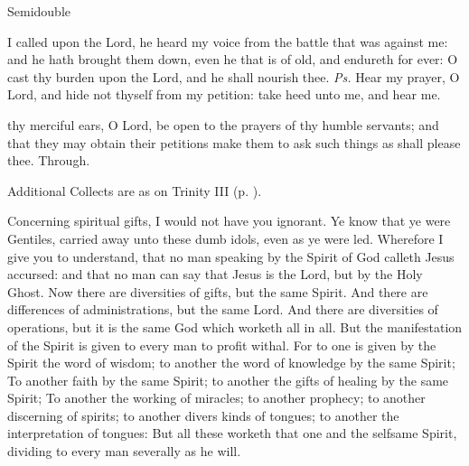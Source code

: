 \begin{inhead}
{Semidouble}
\end{inhead}
\par\noindent
{}



\introit
{} I called upon the Lord, he heard my voice from the battle that was against me: and he hath brought them down, even he that is of old, and endureth for ever: O cast thy burden upon the Lord, and he shall nourish thee. \textit{Ps.} Hear my prayer, O Lord, and hide not thyself from my petition: take heed unto me, and hear me.

\collect
{} thy merciful ears, O Lord, be open to the prayers of thy humble servants; and that they may obtain their petitions make them to ask such things as shall please thee. Through.
\begin{rubric}
    Additional Collects are as on Trinity III (p. \pageref{TrinityIII}).
\end{rubric}

 Concerning spiritual gifts, I would not have you ignorant. Ye know that ye were Gentiles, carried away unto these dumb idols, even as ye were led. Wherefore I give you to understand, that no man speaking by the Spirit of God calleth Jesus accursed: and that no man can say that Jesus is the Lord, but by the Holy Ghost. Now there are diversities of gifts, but the same Spirit. And there are differences of administrations, but the same Lord. And there are diversities of operations, but it is the same God which worketh all in all. But the manifestation of the Spirit is given to every man to profit withal. For to one is given by the Spirit the word of wisdom; to another the word of knowledge by the same Spirit; To another faith by the same Spirit; to another the gifts of healing by the same Spirit; To another the working of miracles; to another prophecy; to another discerning of spirits; to another divers kinds of tongues; to another the interpretation of tongues: But all these worketh that one and the selfsame Spirit, dividing to every man severally as he will.

